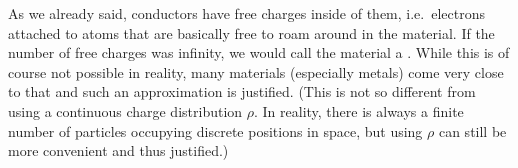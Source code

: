\documentclass[../class_mech_main.tex]{subfiles}
\begin{document}


As we already said, conductors have free charges inside of them, i.e.~electrons attached to atoms that are basically free to roam around in the material. If the number of free charges was infinity, we would call the material a . While this is of course not possible in reality, many materials (especially metals) come very close to that and such an approximation is justified. (This is not so different from using a continuous charge distribution $\rho$. In reality, there is always a finite number of particles occupying discrete positions in space, but using $\rho$ can still be more convenient and thus justified.)
\end{document}

